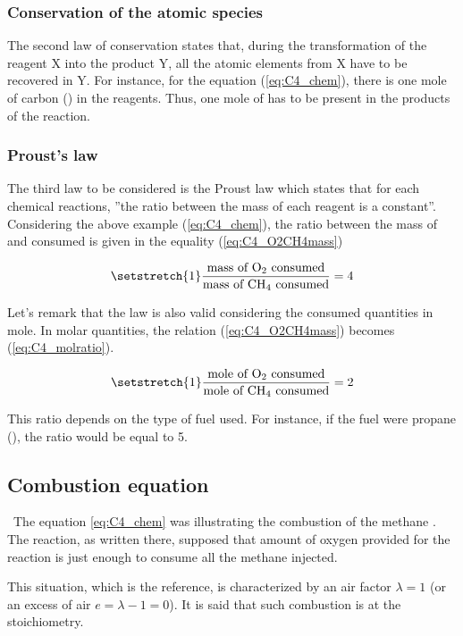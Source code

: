 \subsubsection{Conservation of the atomic species}
The second law of conservation states that, during the transformation of the reagent X into the product Y, all the atomic elements from X have to be recovered in Y. For instance, for the equation (\ref{eq:C4_chem}), there is one mole of carbon () in the reagents. Thus, one mole of  has to be present in the products of the reaction.
\newpage
\subsubsection{Proust's law}
The third law to be considered is the Proust law which states that for each chemical reactions, ''the ratio between the mass of each reagent is a constant''. Considering the above example (\ref{eq:C4_chem}), the ratio between the mass of  and  consumed is given in the equality (\ref{eq:C4_O2CH4mass})

\begin{equation}
    \setstretch{1}
    \frac{\text{mass of \ce{O2} consumed}}{\text{mass of \ce{CH4} consumed}} = 4 \label{eq:C4_O2CH4mass}
\end{equation}

Let's remark that the law is also valid considering the consumed quantities in mole. In molar quantities, the relation (\ref{eq:C4_O2CH4mass}) becomes (\ref{eq:C4_molratio}).

\begin{equation}
    \setstretch{1}
    \frac{\text{mole of \ce{O2} consumed}}{\text{mole of \ce{CH4} consumed}} = 2  \label{eq:C4_molratio}
\end{equation}

This ratio depends on the type of fuel used. For instance, if the fuel were propane (), the ratio would be equal to 5.

\subsection{Combustion equation}
\quad\ The equation \ref{eq:C4_chem} was illustrating the combustion of the methane . The reaction, as written there, supposed that amount of oxygen provided for the reaction is just enough to consume all the methane injected.

This situation, which is the reference, is characterized by an air factor \(\lambda = 1\) (or an excess of air \(e=\lambda-1=0\)). It is said that such combustion is at the stoichiometry.

